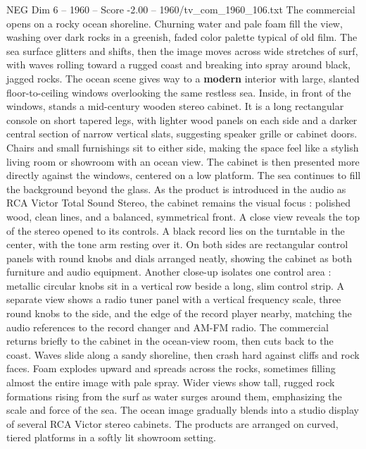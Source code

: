 \begin{textsample}{NEG Dim 6 – 1960 – Score -2.00 – 1960/tv\_com\_1960\_106.txt}  \label{ex:f6_neg_071}
The commercial opens on a rocky ocean shoreline.
Churning water and pale foam fill the view, washing over dark rocks in a greenish, faded color palette typical of old film.
The sea surface glitters and shifts, then the image moves across wide stretches of surf, with waves rolling toward a rugged coast and breaking into spray around black, jagged rocks.
The ocean scene gives way to a \textbf{modern} interior with large, slanted floor-to-ceiling windows overlooking the same restless sea.
Inside, in front of the windows, stands a mid-century wooden stereo cabinet.
It is a long rectangular console on short tapered legs, with lighter wood panels on each side and a darker central section of narrow vertical slats, suggesting speaker grille or cabinet doors.
Chairs and small furnishings sit to either side, making the space feel like a stylish living room or showroom with an ocean view.
The cabinet is then presented more directly against the windows, centered on a low platform.
The sea continues to fill the background beyond the glass.
As the product is introduced in the audio as RCA Victor Total Sound Stereo, the cabinet remains the visual focus : polished wood, clean lines, and a balanced, symmetrical front.
A close view reveals the top of the stereo opened to its controls.
A black record lies on the turntable in the center, with the tone arm resting over it.
On both sides are rectangular control panels with round knobs and dials arranged neatly, showing the cabinet as both furniture and audio equipment.
Another close-up isolates one control area : metallic circular knobs sit in a vertical row beside a long, slim control strip.
A separate view shows a radio tuner panel with a vertical frequency scale, three round knobs to the side, and the edge of the record player nearby, matching the audio references to the record changer and AM-FM radio.
The commercial returns briefly to the cabinet in the ocean-view room, then cuts back to the coast.
Waves slide along a sandy shoreline, then crash hard against cliffs and rock faces.
Foam explodes upward and spreads across the rocks, sometimes filling almost the entire image with pale spray.
Wider views show tall, rugged rock formations rising from the surf as water surges around them, emphasizing the scale and force of the sea.
The ocean image gradually blends into a studio display of several RCA Victor stereo cabinets.
The products are arranged on curved, tiered platforms in a softly lit showroom setting.

\end{textsample}
